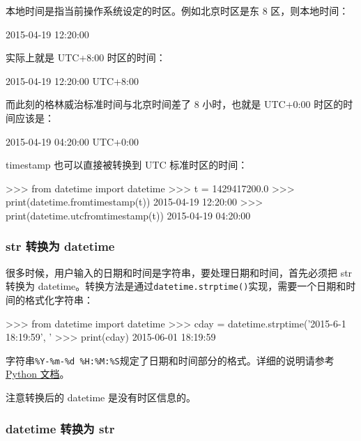 本地时间是指当前操作系统设定的时区。例如北京时区是东 8 区，则本地时间：

\begin{pythoncode}
2015-04-19 12:20:00
\end{pythoncode}

实际上就是 UTC+8:00 时区的时间：

\begin{pythoncode}
2015-04-19 12:20:00 UTC+8:00
\end{pythoncode}

而此刻的格林威治标准时间与北京时间差了 8 小时，也就是 UTC+0:00
时区的时间应该是：

\begin{pythoncode}
2015-04-19 04:20:00 UTC+0:00
\end{pythoncode}

timestamp 也可以直接被转换到 UTC 标准时区的时间：

\begin{pythoncode}
>>> from datetime import datetime
>>> t = 1429417200.0
>>> print(datetime.fromtimestamp(t)) 
2015-04-19 12:20:00
>>> print(datetime.utcfromtimestamp(t)) 
2015-04-19 04:20:00
\end{pythoncode}

\hypertarget{str-ux8f6cux6362ux4e3a-datetime}{%
\subsubsection{str 转换为
datetime}\label{str-ux8f6cux6362ux4e3a-datetime}}

很多时候，用户输入的日期和时间是字符串，要处理日期和时间，首先必须把 str
转换为
datetime。转换方法是通过\texttt{datetime.strptime()}实现，需要一个日期和时间的格式化字符串：

\begin{pythoncode}
>>> from datetime import datetime
>>> cday = datetime.strptime('2015-6-1 18:19:59', '%
>>> print(cday)
2015-06-01 18:19:59
\end{pythoncode}

字符串\texttt{\textquotesingle{}\%Y-\%m-\%d\ \%H:\%M:\%S\textquotesingle{}}规定了日期和时间部分的格式。详细的说明请参考
\href{https://docs.python.org/3/library/datetime.html\#strftime-strptime-behavior}{Python
文档}。

注意转换后的 datetime 是没有时区信息的。

\hypertarget{datetime-ux8f6cux6362ux4e3a-str}{%
\subsubsection{datetime 转换为
str}\label{datetime-ux8f6cux6362ux4e3a-str}}

